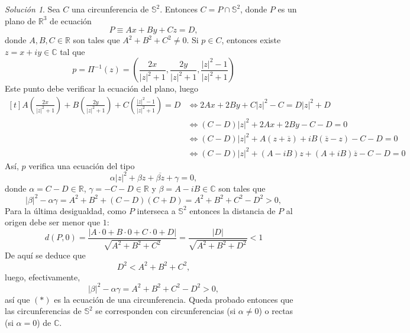 \documentclass[11pt]{report}
\newcommand{\R}{\mathbb R}
\newcommand{\C}{\mathbb C}
\renewcommand{\S}{\mathbb S}
\newcommand{\pars}[1]{\left( #1 \right)} %
\theoremstyle{remark}
\newtheorem*{resolution}{Solución}
\begin{document}
\begin{resolution}
    Sea $C$ una circunferencia de $\S^2$. Entonces $C = P \cap \S^2$, donde $P$ es un plano de $\R^3$ de ecuación
    \[P \equiv Ax+By+Cz = D,\]
    donde $A,B,C \in \R$ son tales que $A^2+B^2+C^2 \neq 0$. Si $p \in C$, entonces existe $z = x+iy \in \C$ tal que
    \[p = \Pi^{-1}(z) = \pars{\frac{2x}{|z|^2+1},\frac{2y}{|z|^2+1},\frac{|z|^2-1}{|z|^2+1}}\]
    Este punto debe verificar la ecuación del plano, luego
    \[
    \begin{aligned}[t]
    A\pars{\frac{2x}{|z|^2+1}}+B\pars{\frac{2y}{|z|^2+1}}+C\pars{\frac{|z|^2-1}{|z|^2+1}} = D &\iff 2Ax+2By+C|z|^2-C = D|z|^2+D \\
    &\iff (C-D)|z|^2+2Ax+2By-C-D=0 \\
    &\iff (C-D)|z|^2+A(z+\overline{z})+iB(\overline{z}-z)-C-D=0 \\
    &\iff (C-D)|z|^2+(A-iB)z+(A+iB)\overline{z}-C-D=0
    \end{aligned}
    \]
    Así, $p$ verifica una ecuación del tipo
    \[\alpha |z|^2+\beta z+\overline{\beta z}+\gamma = 0, \tag{$\ast$}\]
    donde $\alpha = C-D \in \R$, $\gamma = -C-D \in \R$ y $\beta = A-iB \in \C$ son tales que
    \[|\beta|^2-\alpha\gamma = A^2+B^2+(C-D)(C+D) = A^2+B^2+C^2-D^2 > 0,\]
    Para la última desigualdad, como $P$ interseca a $\S^2$ entonces la distancia de $P$ al origen debe ser menor que $1$:
    \[d(P,0) = \frac{|A \cdot 0+B \cdot 0+C \cdot 0+D|}{\sqrt{A^2+B^2+C^2}} = \frac{|D|}{\sqrt{A^2+B^2+D^2}}< 1\]
    De aquí se deduce que
    \[D^2<A^2+B^2+C^2,\]
    luego, efectivamente, \[|\beta|^2-\alpha \gamma =A^2+B^2+C^2-D^2>0,\] así que $(*)$ es la ecuación de una circunferencia. Queda probado entonces que las circunferencias de $\S^2$ se corresponden con circunferencias (si $\alpha \neq 0$) o rectas (si $\alpha = 0$) de $\C$.


\end{resolution}
\end{document}

